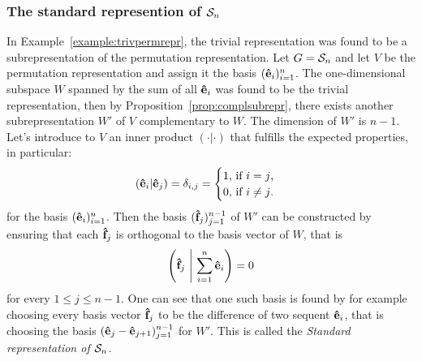{\allowdisplaybreaks\subsubsection{The standard represention of $\mathcal{S}_n$}
In Example~\ref{example:trivpermrepr}, the trivial representation was found to be a subrepresentation of the permutation representation. Let $G= \mathcal{S}_n$ and let $V$ be the permutation representation and assign it the basis $(\mathbf{\hat{e}}_i)_{i=1}^n$. The one-dimensional subspace $W$ spanned by the sum of all $\mathbf{\hat{e}}_i$ was found to be the trivial representation, then by Proposition~\ref{prop:complsubrepr}, there exists another subrepresentation $W'$ of $V$ complementary to $W$. The dimension of $W'$ is $n-1$. Let's introduce to $V$ an inner product $(\cdot|\cdot)$ that fulfills the expected properties, in particular:
\begin{align*}
	(\mathbf{\hat{e}}_i|\mathbf{\hat{e}}_j) = \delta_{i,j} = \begin{cases}
		1 \text{, if $i=j$,}\\
		0 \text{, if $i \neq j$.}
	\end{cases}
\end{align*}
for the basis $(\mathbf{\hat{e}}_i)_{i=1}^n$. Then the basis $(\mathbf{\hat{f}}_j)_{j=1}^{n-1}$ of $W'$ can be constructed by ensuring that each $\mathbf{\hat{f}}_j$ is orthogonal to the basis vector of $W$, that is
\begin{align*}
	\left( \mathbf{\hat{f}}_j \ \middle\vert \ \sum_{i=1}^n \mathbf{\hat{e}}_i \right) = 0
\end{align*}
for every $1 \leq j \leq n-1$. One can see that one such basis is found by for example choosing every basis vector $\mathbf{\hat{f}}_j$ to be the difference of two sequent $\mathbf{\hat{e}}_i$, that is choosing the basis $(\mathbf{\hat{e}}_j - \mathbf{\hat{e}}_{j+1})_{j=1}^{n-1}$ for $W'$. This is called the \emph{Standard representation of $\mathcal{S}_n$.}~\cite[??]{Serre, Sagan, FultonHarris}}

